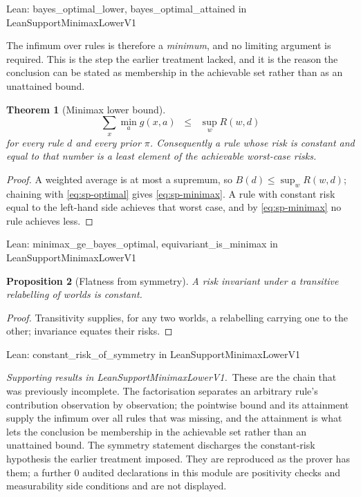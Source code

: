\documentclass[conference]{IEEEtran}
\newtheorem{theorem}{Theorem}
\newtheorem{proposition}[theorem]{Proposition}
\theoremstyle{definition}
\newcommand{\lean}[1]{\textsf{\footnotesize #1}}
\newcommand{\leanbox}[1]{%
  \par\vspace{2pt}\noindent
  {\footnotesize\textsf{Lean: #1}}\par\vspace{2pt}}
\begin{document}
\leanbox{\lean{bayes\_optimal\_lower}, \lean{bayes\_optimal\_attained} in
\lean{LeanSupportMinimaxLowerV1}}

The infimum over rules is therefore a \emph{minimum}, and no limiting argument is required.
This is the step the earlier treatment lacked, and it is the reason the conclusion can be
stated as membership in the achievable set rather than as an unattained bound.

\begin{theorem}[Minimax lower bound]
\label{thm:sp-minimax}
\begin{equation}
\sum_{x}\min_{a}g(x,a)\;\;\leq\;\;\sup_{w}R(w,d)
\label{eq:sp-minimax}
\end{equation}
for every rule $d$ and every prior $\pi$. Consequently a rule whose risk is constant and equal
to that number is a least element of the achievable worst-case risks.
\end{theorem}

\begin{proof}
A weighted average is at most a supremum, so $B(d)\le\sup_{w}R(w,d)$; chaining with
\eqref{eq:sp-optimal} gives \eqref{eq:sp-minimax}. A rule with constant risk equal to the left-hand
side achieves that worst case, and by \eqref{eq:sp-minimax} no rule achieves less.
\end{proof}

\leanbox{\lean{minimax\_ge\_bayes\_optimal}, \lean{equivariant\_is\_minimax} in
\lean{LeanSupportMinimaxLowerV1}}

\begin{proposition}[Flatness from symmetry]
\label{prop:sp-symmetry}
A risk invariant under a transitive relabelling of worlds is constant.
\end{proposition}

\begin{proof}
Transitivity supplies, for any two worlds, a relabelling carrying one to the other;
invariance equates their risks.
\end{proof}

\leanbox{\lean{constant\_risk\_of\_symmetry} in \lean{LeanSupportMinimaxLowerV1}}

\noindent\emph{Supporting results in \lean{LeanSupportMinimaxLowerV1}.}~These are the chain that was previously incomplete. The factorisation separates an arbitrary rule's contribution observation by observation; the pointwise bound and its attainment supply the infimum over all rules that was missing, and the attainment is what lets the conclusion be membership in the achievable set rather than an unattained bound. The symmetry statement discharges the constant-risk hypothesis the earlier treatment imposed. They are reproduced as the prover has them; a further $0$ audited declarations in this module are positivity checks and measurability side conditions and are not displayed.
\end{document}
